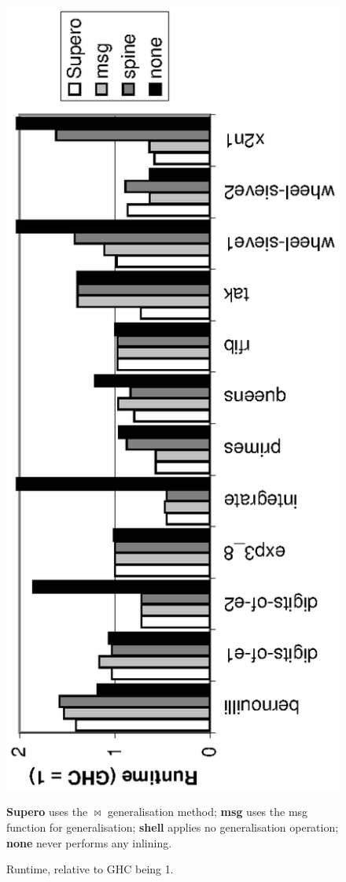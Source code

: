 \begin{figure}
\begin{center}
\includegraphics[scale=0.75,angle=270]{graphics/supero-nofib.eps}
\end{center}

\smallskip
\textbf{Supero} uses the $\bowtie$ generalisation method; \textbf{msg} uses the msg function for generalisation; \textbf{shell} applies no generalisation operation; \textbf{none} never performs any inlining. \\

\caption{Runtime, relative to GHC being 1.}
\label{figS:haskell_results}
\end{figure}

